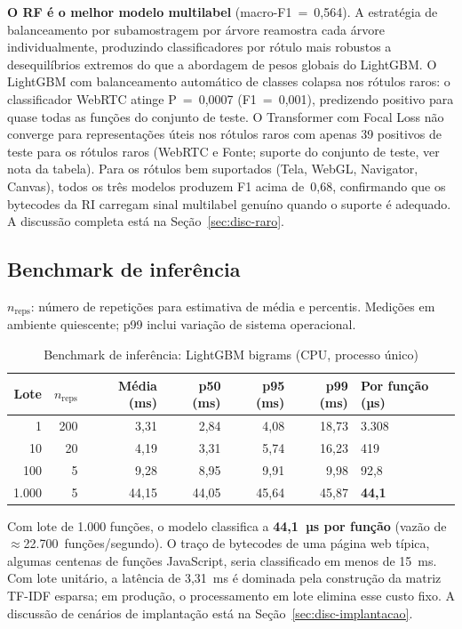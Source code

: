 \textbf{O RF é o melhor modelo multilabel} (macro-F1~=~0,564). A estratégia de
balanceamento por subamostragem por árvore reamostra cada árvore
individualmente, produzindo classificadores por rótulo mais robustos a
desequilíbrios extremos do que a abordagem de pesos globais do LightGBM. O
LightGBM com balanceamento automático de classes colapsa nos rótulos raros: o
classificador WebRTC atinge P~=~0,0007 (F1~=~0,001), predizendo positivo para
quase todas as funções do conjunto de teste. O Transformer com Focal Loss não converge para
representações úteis nos rótulos raros com apenas 39 positivos de teste para os rótulos raros
(WebRTC e Fonte; suporte do conjunto de teste, ver nota da tabela). Para
os rótulos bem suportados (Tela, WebGL, Navigator, Canvas), todos os três modelos
produzem F1 acima de~0,68, confirmando que os bytecodes da RI carregam sinal
multilabel genuíno quando o suporte é adequado. A discussão completa está na
Seção~\ref{sec:disc-raro}.

\subsection{Benchmark de inferência}
\label{sec:inferencia}

\begin{table}[htb]
\centering
\caption{Benchmark de inferência: LightGBM bigrams (CPU, processo único)}
\label{tab:inferencia}
{\footnotesize
$n_{\text{reps}}$: número de repetições para estimativa de média e percentis.
Medições em ambiente quiescente; p99 inclui variação de sistema operacional.
}

\bigskip
{\small
\begin{tabular}{rrrrrrl}
\toprule
\textbf{Lote} & \textbf{$n_{\text{reps}}$} & \textbf{Média (ms)} & \textbf{p50 (ms)} & \textbf{p95 (ms)} & \textbf{p99 (ms)} & \textbf{Por função (µs)} \\
\midrule
    1 & 200 &  3,31 &  2,84 &  4,08 & 18,73 & 3.308 \\
   10 &  20 &  4,19 &  3,31 &  5,74 & 16,23 &   419 \\
  100 &   5 &  9,28 &  8,95 &  9,91 &  9,98 &  92,8 \\
1.000 &   5 & 44,15 & 44,05 & 45,64 & 45,87 & \textbf{44,1} \\
\bottomrule
\end{tabular}
}%
{}
\end{table}

Com lote de 1.000 funções, o modelo classifica a \textbf{44,1~µs por função}
(vazão de $\approx$22.700~funções/segundo). O traço de bytecodes de uma página web
típica, algumas centenas de funções JavaScript, seria classificado em menos
de 15~ms. Com lote unitário, a latência de 3,31~ms é dominada pela construção da
matriz TF-IDF esparsa; em produção, o processamento em lote elimina esse custo
fixo. A discussão de cenários de implantação está na
Seção~\ref{sec:disc-implantacao}.

